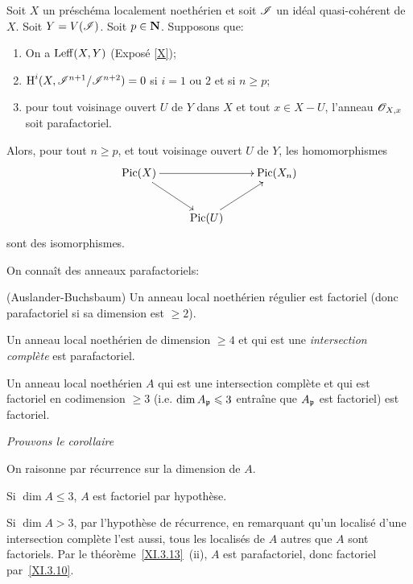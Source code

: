 \begin{proposition} \label{XI.3.12}
Soit $X$ un pr\'esch\'ema localement noeth\'erien et soit ${\mathscr I}$ un id\'eal quasi-coh\'erent de $X$. Soit $Y=V({\mathscr I})$. Soit $p\in\mathbf{N}$. Supposons que:
\begin{enumerate}
\item[1)] On a $\operatorname{Leff}(X, Y)$ (\textup{Exposé} \ref{X});
\item[2)] $\operatorname{H}^i(X, {\mathscr I}^{n+1}/{\mathscr I}^{n+2})=0$ si $i=1$ ou $2$ et si $n\geq p$;
\item[3)] pour tout voisinage ouvert $U$ de $Y$ dans $X$ et tout $x\in X-U$, l'anneau $\mathscr{O}_{X, x}$ soit parafactoriel.
\end{enumerate}
\noindent
Alors, pour tout $n\geq p$, et tout voisinage ouvert $U$ de $Y$, les homomorphismes
\[
\xymatrix{{\mathrm{Pic}(X)}\ar[rr]\ar[dr]&&{\mathrm{Pic}(X_n)}\\&{\mathrm{Pic}(U)}\ar[ur]&}
\]
sont des isomorphismes.
\end{proposition}

On conna\^it des anneaux parafactoriels:

\skpt
\begin{theoreme} \label{XI.3.13}
\begin{enumeratei}
\item
(Auslander-Buchsbaum) Un anneau local noeth\'erien r\'egulier est factoriel (donc parafactoriel si sa dimension est $\geq 2$).
\item
Un anneau local noeth\'erien de dimension $\geq 4$ et qui est une \emph{intersection complète} est parafactoriel.
\end{enumeratei}
\end{theoreme}

\begin{corollaire} Un anneau local noeth\'erien $A$ qui est une intersection compl\`ete et qui est factoriel en codimension $\geq 3$ (i.e. $\dim A_{{\mathfrak{p}}}\leqslant 3$ entra\^ine que $A_{{\mathfrak{p}}}$ est factoriel) est factoriel.
\end{corollaire}

\emph{Prouvons le corollaire}

On raisonne par r\'ecurrence sur la dimension de $A$.

Si $\dim A\leq 3$, $A$ est factoriel par hypoth\`ese.

Si $\dim A>3$, par l'hypoth\`ese de r\'ecurrence, en remarquant qu'un localis\'e d'une intersection compl\`ete l'est aussi, tous les localis\'es de $A$ autres que $A$ sont factoriels. Par le th\'eor\`eme~\ref{XI.3.13}~(ii), $A$ est parafactoriel, donc factoriel par~\ref{XI.3.10}.

